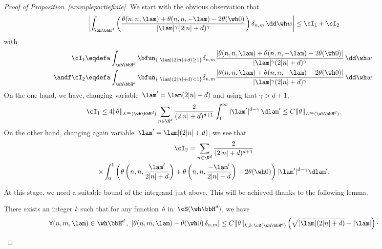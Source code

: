 \begin{proof}[Proof of Proposition~\ref{examplepartiefinie}]
We start with the obvious observation that
\[
\left|
\int_{\wh \bbH^d}
\left(\frac {\theta(n,n,\lam)+ \theta(n,n,-\lam) -2\theta(\wh 0) }{ |\lam|^\gamma (2|n|+d)^\gamma} \right)\delta_{n,m} \,\dd\wh w\right|
\leq \cI_1 +\cI_2
\]
with
\[
\begin{aligned}
\cI_1&\eqdefa \int_{\wh \bbH^d} \bfun_{\{|\lam|(2|n|+d)\geq 1 \}} \delta_{n,m} \frac {\left|\theta(n,n,\lam)+ \theta(n,n,-\lam) -2\theta(\wh 0) \right|}{ |\lam|^\gamma (2|n|+d)^\gamma}\,\dd\wh w\\ \andf\cI_2&\eqdefa \int_{\wh \bbH^d} \bfun_{\{|\lam|(2|n|+d)<1 \}} \delta_{n,m} \frac {\left|\theta(n,n,\lam)+ \theta(n,n,-\lam) -2\theta(\wh 0) \right|}{ |\lam|^\gamma (2|n|+d)^\gamma}\,\dd\wh w.
\end{aligned}
\]
On the one hand, we have, changing variable~$\lam' = \lam (2|n|+d)$ and using that $\gamma>d+1$,
\begin{equation}\label{examplepartiefiniedemoeq1}
\cI_1 \leq 4\|\theta\|_{L^\infty(\wh \bbH^d)} \sum_{n\in \N^d} \frac {2}{ (2|n|+d)^{d+1} } \int_1^\infty |\lam'|^{d-\gamma} \, \dlam'\leq C\|\theta\|_{L^\infty(\wh \bbH^d)}.
\end{equation}
On the other hand, changing again variable~$\lam'= \lam|(2|n|+d)$, we see that
\begin{multline*}
\cI_2 = \sum_{n\in \N^d} \frac {2}{ (2|n|+d)^{d+1} }\\
\times \int_0^1 \left(\theta\left (n,n,\frac {\lam'} {2|n|+d}\right) +\theta \left (n,n,\frac {-\lam'} {2|n|+d}\right) -2\theta(\wh 0)\right) |\lam'|^{d-\gamma} \dlam'.
\end{multline*}

At this stage, we need a suitable bound of the integrand just above. This will be achieved thanks to the following lemma.

\begin{lemm}\label{lemmaproofexamplepartiefinie}
There exists an integer $k$ such that for any function~$\theta$ in~$\cS(\wh \bbH^d)$, we have
\[
\forall (n,m,\lam)\in \wh\bbH^d\,,\ |\theta (n,m,\lam)-\theta (\wh 0)\,\delta_{n,m}| \leq C \|\theta\|_{k,k,\cS(\wh \bbH^d)}
\left(\sqrt {|\lam| (2|n|+d)}+|\lam|\right)\cdotp
\]
\end{lemm}


\end{proof}
